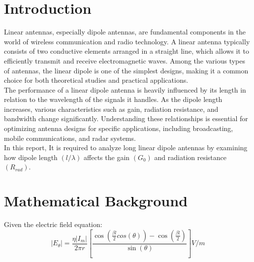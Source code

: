 \documentclass[a4paper, 12pt, english]{article}
\begin{document}

  \newpage
  \hypersetup{linkcolor=black}
  \tableofcontents

\newpage
\section{Introduction}
Linear antennas, especially dipole antennas, are fundamental components in the world of wireless communication and radio technology. A linear antenna typically consists of two conductive elements arranged in a straight line, which allows it to efficiently transmit and receive electromagnetic waves. Among the various types of antennas, the linear dipole is one of the simplest designs, making it a common choice for both theoretical studies and practical applications. \\

The performance of a linear dipole antenna is heavily influenced by its length in relation to the wavelength of the signals it handles. As the dipole length increases, various characteristics such as gain, radiation resistance, and bandwidth change significantly. Understanding these relationships is essential for optimizing antenna designs for specific applications, including broadcasting, mobile communications, and radar systems. \\

In this report, It is required to analyze long linear dipole antennas by examining how dipole length $(l/\lambda)$ affects the gain $(G_0)$ and radiation resistance $(R_{rad})$. 

\section{Mathematical Background}
Given the electric field equation:
\begin{equation}
    \left|{E}_{\theta} \right| = \frac{{\eta}{\left| {I}_{m} \right|}}{{2}{\pi}{r}} \left[ \frac{\cos{\left(\frac{{\beta}{l}}{2} cos(\theta)\right)} - \cos{\left(\frac{{\beta}{l}}{2}\right)}}{\sin{\left(\theta\right)}} \right] {V}/{m}
\end{equation}
\end{document}
